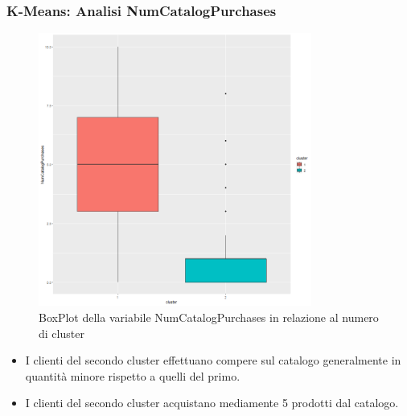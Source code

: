 \begin{frame}[fragile]
\frametitle{K-Means: Analisi NumCatalogPurchases}
\begin{minipage}{0.45\textwidth}
\begin{figure}[H]
        \centering
    \includegraphics[width=0.8\textwidth]{Img/KMEANS018.png}
    \caption{BoxPlot della variabile NumCatalogPurchases in relazione al numero di cluster}
    \label{fig:NumCatalogPurchasesKmeansBoxPlot}
\end{figure}
\end{minipage}%
\hspace{2em}
\begin{minipage}{0.45\textwidth}
\begin{itemize}
    \item I clienti del secondo cluster effettuano compere sul catalogo generalmente in quantità minore rispetto a quelli del primo.
    \item I clienti del secondo cluster acquistano mediamente 5 prodotti dal catalogo.
\end{itemize}
\end{minipage}%
\end{frame}
